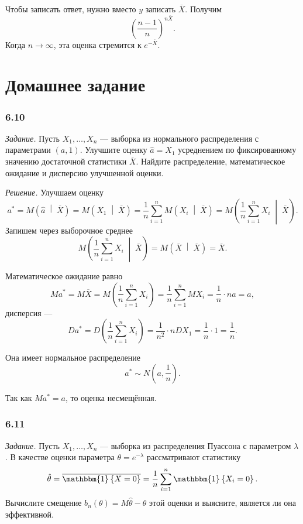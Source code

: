 Чтобы записать ответ, нужно вместо $y$ записать $ \overline{X}$.
Получим
$$ \left( \frac{n - 1}{n} \right)^{n \overline{X}}.$$
Когда $n \to \infty $, эта оценка стремится к $e^{- \overline{X}}$.

\section*{Домашнее задание}

\subsubsection*{6.10}

\textit{Задание.}
Пусть $X_1, \dotsc, X_n$ ---
выборка из нормального распределения с параметрами $ \left( a, 1 \right) $.
Улучшите оценку $ \hat{a} = X_1$ усреднением по фиксированному значению достаточной
статистики $ \overline{X}$.
Найдите распределение, математическое ожидание и дисперсию улучшенной оценки.

\textit{Решение.} Улучшаем оценку
$$a^* =
  M \left( \hat{a} \; \middle| \; \overline{X} \right) =
  M \left( X_1 \; \middle| \; \overline{X} \right) =
  \frac{1}{n} \sum \limits_{i = 1}^n M \left( X_i \; \middle| \; \overline{X} \right) =
  M \left( \frac{1}{n} \sum \limits_{i = 1}^n X_i \; \middle| \; \overline{X} \right).$$
Запишем через выборочное среднее
$$M \left( \frac{1}{n} \sum \limits_{i = 1}^n X_i \; \middle| \; \overline{X} \right) =
  M \left( \overline{X} \; \middle| \; \overline{X} \right) =
  \overline{X}.$$

Математическое ожидание равно
$$Ma^* =
  M \overline{X} =
  M \left( \frac{1}{n} \sum \limits_{i = 1}^n X_i \right) =
  \frac{1}{n} \sum \limits_{i = 1}^n MX_i =
  \frac{1}{n} \cdot na =
  a,$$
дисперсия ---
$$Da^* =
  D \left( \frac{1}{n} \sum \limits_{i = 1}^n X_i \right) =
  \frac{1}{n^2} \cdot n DX_1 =
  \frac{1}{n} \cdot 1 =
  \frac{1}{n}.$$

Она имеет нормальное распределение
$$a^* \sim
  N \left( a, \frac{1}{n} \right).$$

Так как $Ma^* = a$, то оценка несмещённая.

\subsubsection*{6.11}

\textit{Задание.}
Пусть $X_1, \dotsc, X_n$ --- выборка из распределения Пуассона с параметром $ \lambda $.
В качестве оценки параметра $ \theta = e^{- \lambda }$ рассматривают статистику
$$ \hat{ \theta } =
  \overline{ \mathbbm{1} \left\{ X = 0 \right\} } =
  \frac{1}{n} \sum \limits_{i = 1}^n \mathbbm{1} \left\{ X_i = 0 \right\}.$$
Вычислите смещение $b_n \left( \theta \right) = M \hat{ \theta } - \theta $ этой оценки и выясните,
является ли она эффективной.

